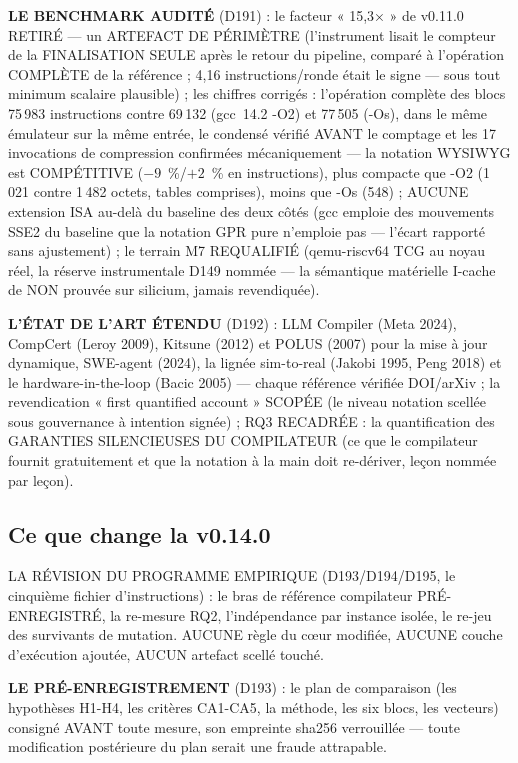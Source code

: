 \textbf{LE BENCHMARK AUDITÉ} (D191) : le facteur « 15,3× » de v0.11.0
RETIRÉ — un ARTEFACT DE PÉRIMÈTRE (l'instrument lisait le compteur de la
FINALISATION SEULE après le retour du pipeline, comparé à l'opération
COMPLÈTE de la référence ; 4,16 instructions/ronde était le signe — sous
tout minimum scalaire plausible) ; les chiffres corrigés : l'opération
complète des blocs 75\,983 instructions contre 69\,132 (gcc~14.2 -O2) et
77\,505 (-Os), dans le même émulateur sur la même entrée, le condensé
vérifié AVANT le comptage et les 17 invocations de compression confirmées
mécaniquement — la notation WYSIWYG est COMPÉTITIVE ($-9$~\%/$+2$~\% en
instructions), plus compacte que -O2 (1\,021 contre 1\,482 octets, tables
comprises), moins que -Os (548) ; AUCUNE extension ISA au-delà du baseline
des deux côtés (gcc emploie des mouvements SSE2 du baseline que la notation
GPR pure n'emploie pas — l'écart rapporté sans ajustement) ; le terrain M7
REQUALIFIÉ (qemu-riscv64 TCG au noyau réel, la réserve instrumentale D149
nommée — la sémantique matérielle I-cache de  NON prouvée sur
silicium, jamais revendiquée).

\textbf{L'ÉTAT DE L'ART ÉTENDU} (D192) : LLM Compiler (Meta 2024), CompCert
(Leroy 2009), Kitsune (2012) et POLUS (2007) pour la mise à jour dynamique,
SWE-agent (2024), la lignée sim-to-real (Jakobi 1995, Peng 2018) et le
hardware-in-the-loop (Bacic 2005) — chaque référence vérifiée DOI/arXiv ;
la revendication « first quantified account » SCOPÉE (le niveau notation
scellée sous gouvernance à intention signée) ; RQ3 RECADRÉE : la
quantification des GARANTIES SILENCIEUSES DU COMPILATEUR (ce que le
compilateur fournit gratuitement et que la notation à la main doit
re-dériver, leçon nommée par leçon).

\subsection{Ce que change la v0.14.0}\label{sec:nouveautes140}

LA RÉVISION DU PROGRAMME EMPIRIQUE (D193/D194/D195, le cinquième fichier
d'instructions) : le bras de référence compilateur PRÉ-ENREGISTRÉ, la
re-mesure RQ2, l'indépendance par instance isolée, le re-jeu des
survivants de mutation. AUCUNE règle du cœur modifiée, AUCUNE couche
d'exécution ajoutée, AUCUN artefact scellé touché.

\textbf{LE PRÉ-ENREGISTREMENT} (D193) : le plan de comparaison (les
hypothèses H1-H4, les critères CA1-CA5, la méthode, les six blocs, les
vecteurs) consigné AVANT toute mesure, son empreinte sha256 verrouillée —
toute modification postérieure du plan serait une fraude attrapable.

